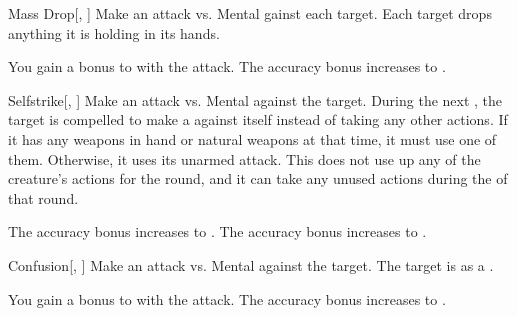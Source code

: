 \lowercase{\hypertarget{spell:Mass Drop}{}}\label{spell:Mass Drop}
\begin{freeability}[Rank 4]{\hypertarget{spell:Mass Drop}{Mass Drop}}[, ]
Make an attack vs. Mental gainst each target.
\hit Each target drops anything it is holding in its hands.

\rankline
{} You gain a  bonus to  with the attack.
 The accuracy bonus increases to .
\end{freeability}
\vspace{0.25em}



\lowercase{\hypertarget{spell:Selfstrike}{}}\label{spell:Selfstrike}
\begin{freeability}[Rank 4]{\hypertarget{spell:Selfstrike}{Selfstrike}}[, ]
Make an attack vs. Mental against the target.
\hit During the next , the target is compelled to make a  against itself instead of taking any other actions.
If it has any weapons in hand or natural weapons at that time, it must use one of them.
Otherwise, it uses its unarmed attack.
This does not use up any of the creature's actions for the round, and it can take any unused actions during the  of that round.

\rankline
{} The accuracy bonus increases to .
 The accuracy bonus increases to .
\end{freeability}
\vspace{0.25em}



\lowercase{\hypertarget{spell:Confusion}{}}\label{spell:Confusion}
\begin{freeability}[Rank 5]{\hypertarget{spell:Confusion}{Confusion}}[, ]
Make an attack vs. Mental against the target.
\hit The target is \confused as a .

\rankline
{} You gain a  bonus to  with the attack.
 The accuracy bonus increases to .
\end{freeability}
\vspace{0.25em}



